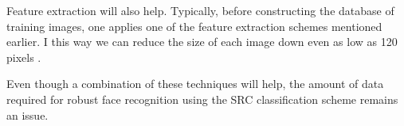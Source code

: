Feature extraction will also help. Typically, before constructing the database of training images, one applies one of the feature extraction schemes mentioned earlier. I this way we can reduce the size of each image down even as low as 120 pixels \cite[Section~12.2]{eldar12theoryapplic}.

Even though a combination of these techniques will help, the amount of data required for robust face recognition using the SRC classification scheme remains an issue. 






